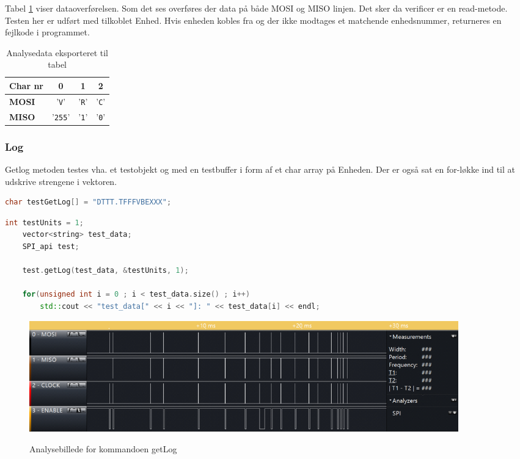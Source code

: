 Tabel \ref{table:scop_verify} viser dataoverførelsen. Som det ses overføres der data på både MOSI og MISO linjen. Det sker da verificer er en read-metode. Testen her er udført med tilkoblet Enhed. Hvis enheden kobles fra og der ikke modtages et matchende enhedsnummer, returneres en fejlkode i programmet. 
 

\begin{table}[H]
	\caption{Analysedata eksporteret til tabel}
	\centering
	\begin{tabular}{|l|c|c|c|}
		\hline 
		\textbf{Char nr} & \textbf{0} & \textbf{1} & \textbf{2}\\ 		
		\hline 
		\textbf{MOSI} & '\verb+V+' & '\verb+R+'  & '\verb+C+'\\ 
		\hline 
		\textbf{MISO} & '\verb+255+' & '\verb+1+' & '\verb+0+' \\ 
		\hline 
	\end{tabular} 
	\label{table:scop_verify}
\end{table}



\subsubsection*{Log}
Getlog metoden testes vha. et testobjekt og med en testbuffer i form af et char array på Enheden. Der er også sat en for-løkke ind til at udskrive strengene i vektoren.

\begin{lstlisting}[language=C]
char testGetLog[] = "DTTT.TFFFVBEXXX";
\end{lstlisting}

\begin{lstlisting}[language=C++]
	int testUnits = 1;
	vector<string> test_data;
	SPI_api test;

	test.getLog(test_data, &testUnits, 1);
	
	for(unsigned int i = 0 ; i < test_data.size() ; i++)
		std::cout << "test_data[" << i << "]: " << test_data[i] << endl;
\end{lstlisting}

\begin{figure}[H]
\centering
{\includegraphics[width=0.90\textwidth]{filer/integrationstest/billeder/spi_getlog_and_error}}
\caption{Analysebillede for kommandoen getLog}
\label{lab:scop_getlog}
\end{figure}

